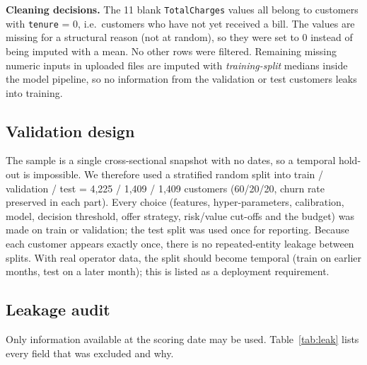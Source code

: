 \documentclass[11pt,a4paper]{article}
\begin{document}
\textbf{Cleaning decisions.} The 11 blank \texttt{TotalCharges} values all belong to customers with \texttt{tenure} = 0, i.e.\ customers who have not yet received a bill. The values are missing for a structural reason (not at random), so they were set to 0 instead of being imputed with a mean. No other rows were filtered. Remaining missing numeric inputs in uploaded files are imputed with \emph{training-split} medians inside the model pipeline, so no information from the validation or test customers leaks into training.

\subsection{Validation design}

The sample is a single cross-sectional snapshot with no dates, so a temporal hold-out is impossible. We therefore used a stratified random split into train / validation / test = 4,225 / 1,409 / 1,409 customers (60/20/20, churn rate preserved in each part). Every choice (features, hyper-parameters, calibration, model, decision threshold, offer strategy, risk/value cut-offs and the budget) was made on train or validation; the test split was used once for reporting. Because each customer appears exactly once, there is no repeated-entity leakage between splits. With real operator data, the split should become temporal (train on earlier months, test on a later month); this is listed as a deployment requirement.

\subsection{Leakage audit}\label{sec:leakage}

Only information available at the scoring date may be used. Table~\ref{tab:leak} lists every field that was excluded and why.
\end{document}

